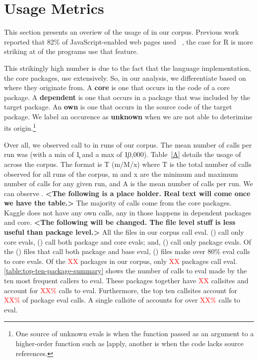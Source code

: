 \documentclass[conference]{IEEEtran}
\newcommand{\missingNumber}{\textcolor{red}{XX}\xspace}
\newcommand{\missingPercentage}{\textcolor{red}{XX\%}\xspace}
\begin{document}
\section{Usage Metrics}

This section presents an overiew of the usage of \eval in our corpus.
Previous work reported that 82\% of JavaScript-enabled web pages used
\eval~\cite{ecoop11}, the case for R is more striking at  of the
programs use that feature.

This strikingly high number is due to the fact that the language
implementation, the core packages, use \eval extensively. So, in our
analysis, we differentiate \eval based on where they originate from. A {\bf
  core} \eval is one that occurs in the code of a core package.  A {\bf
  dependent} \eval is one that occurs in a package that was included by the
target package. An {\bf own} \eval is one that occurs in the source code of
the target package. We label an \eval occurence as {\bf unknown} when we are
not able to deterimine its origin.\footnote{One source of unknown evals is
  when the \eval function passed as an argument to a higher-order function
  such as \c{lapply}, another is when the code lacks source references.}

Over all, we observed \AllAllCallCountRnd call to \eval in  runs
of our corpus. The mean number of calls per run was  (with a min of
\c{1} and a max of \c{10,000}). Table~\ref{A} details the usage of \eval
across the corpus.  The format is T (m/M/x) where T is the total number of
calls observed for all runs of the corpus, m and x are the minimum and
maximum number of calls for any given run, and A is the mean number of calls
per run.  We can observe . {\bf <The following is a place
  holder. Real text will come once we have the table.>} The majority of
calls come from the core packages.  Kaggle does not have any own calls, any
\eval in those happens in dependent packages and core.  {\bf <The following
  will be changed. The file level stuff is less useful than package level.>}
All the \TotalFileCount files in our corpus call eval. \CoreEvalFileCount
(\CoreEvalFilePerc) call only core evals, \AllEvalFileCount
(\AllEvalFilePerc) call both package and core evals; and,
\PackageEvalFileCount (\PackageEvalFilePerc) call only package evals. Of the
\AllEvalFileCount (\AllEvalFilePerc) files that call both package and base
eval, \EightyCoreEvalFilePerc (\EightyCoreEvalFileCount) files make over
80\% eval calls to core evals. Of the \missingNumber packages in our corpus,
only \missingNumber packages call eval. \ref{table:top-ten-package-summary}
shows the number of calls to eval made by the ten most frequent callers to
eval. These packages together have \missingNumber callsites and account for
\missingPercentage calls to eval.  Furthermore, the top ten callsites
account for \missingPercentage of package eval calls. A single callsite of
\TopTenPackageNameA accounts for over \missingPercentage calls to eval.
\end{document}

